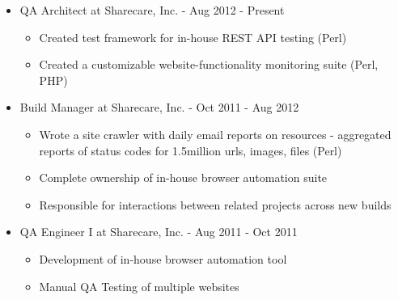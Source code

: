 \documentclass[10pt]{article}
\newenvironment{myitem}{
\begin{itemize}
  \setlength{\itemsep}{1pt}
  \setlength{\parskip}{0pt}
  \setlength{\parsep}{0pt}
}{\end{itemize}}
\begin{document}
\begin{myitem}
  \item QA Architect at Sharecare, Inc. - \hfill Aug 2012 - Present
  \begin{myitem}
    \item Created test framework for in-house REST API testing (Perl)
    \item Created a customizable website-functionality monitoring suite (Perl, PHP) 
  \end{myitem}

  \item Build Manager at Sharecare, Inc. - \hfill Oct 2011 - Aug 2012
  \begin{myitem}
    \item Wrote a site crawler with daily email reports on resources - aggregated reports of status codes for 1.5million urls, images, files (Perl)
    \item Complete ownership of in-house browser automation suite 
    \item Responsible for interactions between related projects across new builds
  \end{myitem}

  \item QA Engineer I at Sharecare, Inc. - \hfill Aug 2011 - Oct 2011
  \begin{myitem}
    \item Development of in-house browser automation tool 
    \item Manual QA Testing of multiple websites
  \end{myitem}
\end{myitem}
\end{document}
